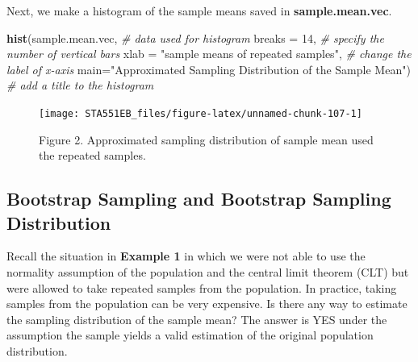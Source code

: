 \documentclass[
]{book}
\newenvironment{Shaded}{\begin{snugshade}}{\end{snugshade}}
\newcommand{\AttributeTok}[1]{\textcolor[rgb]{0.13,0.29,0.53}{#1}}
\newcommand{\CommentTok}[1]{\textcolor[rgb]{0.56,0.35,0.01}{\textit{#1}}}
\newcommand{\DecValTok}[1]{\textcolor[rgb]{0.00,0.00,0.81}{#1}}
\newcommand{\FunctionTok}[1]{\textcolor[rgb]{0.13,0.29,0.53}{\textbf{#1}}}
\newcommand{\NormalTok}[1]{#1}
\newcommand{\StringTok}[1]{\textcolor[rgb]{0.31,0.60,0.02}{#1}}
\begin{document}
Next, we make a histogram of the sample means saved in \textbf{sample.mean.vec}.

\begin{Shaded}
\begin{Highlighting}[]
\FunctionTok{hist}\NormalTok{(sample.mean.vec,                                               }\CommentTok{\# data used for histogram}
     \AttributeTok{breaks =} \DecValTok{14}\NormalTok{,                                                   }\CommentTok{\# specify the number of vertical bars}
     \AttributeTok{xlab =} \StringTok{"sample means of repeated samples"}\NormalTok{,                     }\CommentTok{\# change the label of x{-}axis}
     \AttributeTok{main=}\StringTok{"Approximated Sampling Distribution of the Sample Mean"}\NormalTok{)   }\CommentTok{\# add a title to the histogram}
\end{Highlighting}
\end{Shaded}

\begin{figure}

{\centering \texttt{[image: STA551EB\_files/figure-latex/unnamed-chunk-107-1]} 

}

\caption{Figure 2. Approximated sampling distribution of sample mean used the repeated samples.}\label{fig:unnamed-chunk-107}
\end{figure}

\hypertarget{bootstrap-sampling-and-bootstrap-sampling-distribution}{%
\subsection{Bootstrap Sampling and Bootstrap Sampling Distribution}\label{bootstrap-sampling-and-bootstrap-sampling-distribution}}

Recall the situation in \textbf{Example 1} in which we were not able to use the normality assumption of the population and the central limit theorem (CLT) but were allowed to take repeated samples from the population. In practice, taking samples from the population can be very expensive. Is there any way to estimate the sampling distribution of the sample mean? The answer is YES under the assumption the sample yields a valid estimation of the original population distribution.
\end{document}

